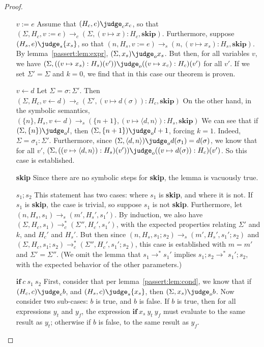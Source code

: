 \begin{proof}
  \begin{itemize}
  \item[$v := e$] Assume that $(H_c, e) \judge_c x_c$, so that
    $(\Sigma, H_c, v := e) \to_c (\Sigma, (v \mapsto x):H_c, \mathbf{skip})$.
    Furthermore, suppose $(H_s, e) \judge_s \{ x_s \}$, so that
    $(n, H_s, v := e) \to_s (n, (v \mapsto x_s):H_s, \mathbf{skip})$.
    By lemma~\ref{passert:lem:expr}, $(\Sigma, x_s) \judge_o x_s$.  But then,
    for all variables $v$, we have
    $(\Sigma, ((v \mapsto x_s):H_s)(v')) \judge_o ((v \mapsto x_c):H_c)(v')$
    for all $v'$.  If we set $\Sigma' = \Sigma$ and $k = 0$, we find
    that in this case our theorem is proven.
  \item[$v \leftarrow d$] Let $\Sigma = \sigma:\Sigma'$.  Then
    $(\Sigma, H_c, v \leftarrow d) \to_c (\Sigma', (v \mapsto d(\sigma)):H_c, \mathbf{skip})$
    On the other hand, in the symbolic semantics,
    $(\{ n \}, H_s, v \leftarrow d) \to_s (\{ n+1 \}, (v \mapsto \langle d, n \rangle):H_s, \mathbf{skip})$
    We can see that
    if $(\Sigma, \{ n \}) \judge_o l$, then $(\Sigma, \{n + 1\}) \judge_o l + 1$,
    forcing $k = 1$. Indeed, $\Sigma = \sigma_1:\Sigma'$.  Furthermore, since
    $(\Sigma, \langle d, n \rangle) \judge_o d(\sigma_1) = d(\sigma)$,
    we know that for all $v'$,
    $(\Sigma, ((v \mapsto \langle d, n \rangle):H_s)(v')) \judge_o ((v \mapsto d(\sigma)):H_c)(v')$.
    So this case is established.
  \item[\textbf{skip}] Since there are no symbolic steps
    for \textbf{skip}, the lemma is vacuously true.
  \item[$s_1 ; s_2$] This statement has two cases: where $s_1$ is
    \textbf{skip}, and where it is not.  If $s_1$ is \textbf{skip},
    the case is trivial, so suppose $s_1$ is not \textbf{skip}.
    Furthermore, let $(n, H_s, s_1) \to_s (m', H_s', s_1')$.
    By induction, we also have
    $(\Sigma, H_c, s_1) \to_c^{*} (\Sigma'', H_c', s_1')$,
    with the expected properties relating $\Sigma'$ and $k$, and
    $H_c'$ and $H_s'$.  But then since
    $(n, H_s, s_1 ; s_2) \to_s (m', H_s', s_1' ; s_2)$
    and
    $(\Sigma, H_c, s_1 ; s_2) \to_c^{*} (\Sigma'', H_c', s_1' ; s_2)$,
    this case is established with $m = m'$ and $\Sigma' = \Sigma''$.
    (We omit the lemma that
    $s_1 \to^{*} s_1'$ implies $s_1 ; s_2 \to^{*} s_1' ; s_2$,
    with the expected behavior of the other parameters.)
  \item[$\mathbf{if}\:c\:s_1\:s_2$]
    First, consider that per lemma~\ref{passert:lem:cond},
      we know that if $(H_c, c) \judge_c b$,
      and $(H_s, c) \judge_s \{ x_s \}$,
      then $(\Sigma, x_s) \judge_o b$.
    Now consider two sub-cases:
      $b$ is true, and $b$ is false.
    If $b$ is true,
      then for all expressions $y_t$ and $y_f$,
      the expression $\mathbf{if}\:x_s\:y_t\:y_f$
      must evaluate to the same result as $y_t$;
      otherwise if $b$ is false,
      to the same result as $y_f$.


\end{itemize}
\end{proof}
